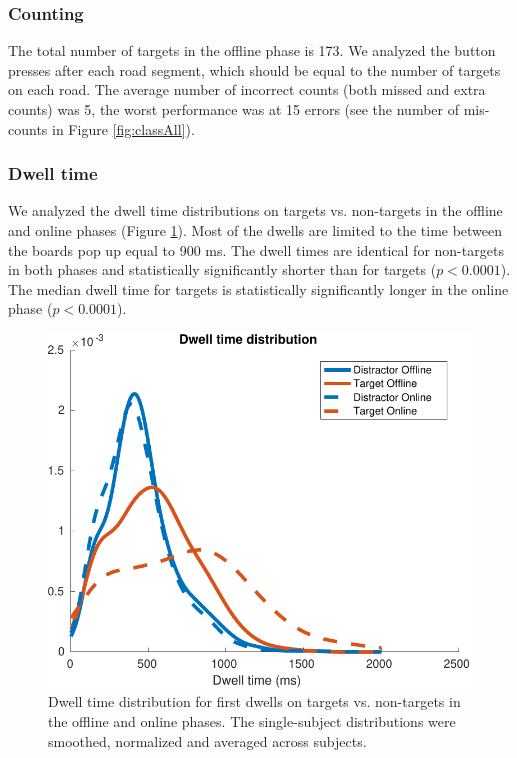 \documentclass[12pt]{iopart}
\begin{document}
\subsubsection*{Counting}
The total number of targets in the offline phase is 173.
We analyzed the button presses after each road segment,
which should be equal to the number of targets
on each road.
The average number of incorrect counts (both missed and extra counts) was 5,
the worst performance was at 15 errors (see the number of mis-counts in Figure \ref{fig:classAll}).


\subsubsection*{Dwell time}
We analyzed the dwell time distributions on targets vs. non-targets
in the offline and online phases (Figure \ref{fig:dwell}). 
Most of the dwells are limited to the time between the boards pop up equal to 900 ms.
The dwell times are identical for non-targets in both phases and statistically significantly
shorter than for targets ($p < 0.0001$).
The median dwell time for targets is statistically significantly longer in the online phase ($p < 0.0001$).

\begin{figure}[!t]
\center
    \includegraphics[trim={0cm 0cm 0cm 0cm},clip,width=0.6\columnwidth]{../images/DwelltimeDist_online_allmean.pdf}
    \caption{Dwell time distribution for first dwells on
    targets vs. non-targets in the offline and online phases. The single-subject
    distributions were smoothed, normalized and averaged across subjects.}
\label{fig:dwell}
\end{figure}
\end{document}
